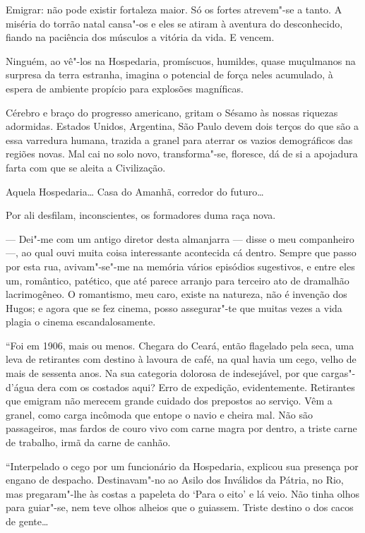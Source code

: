 Emigrar: não pode existir fortaleza maior. Só os fortes atrevem"-se a
tanto. A miséria do torrão natal cansa"-os e eles se atiram à aventura do
desconhecido, fiando na paciência dos músculos a vitória da vida. E
vencem.

Ninguém, ao vê"-los na Hospedaria, promíscuos, humildes, quase muçulmanos
na surpresa da terra estranha, imagina o potencial de força neles
acumulado, à espera de ambiente propício para explosões magníficas.

Cérebro e braço do progresso americano, gritam o Sésamo às nossas
riquezas adormidas. Estados Unidos, Argentina, São Paulo devem dois
terços do que são a essa varredura humana, trazida a granel para aterrar
os vazios demográficos das regiões novas. Mal cai no solo novo,
transforma"-se, floresce, dá de si a apojadura farta com que se aleita a
Civilização.

Aquela Hospedaria\ldots{} Casa do Amanhã, corredor do futuro\ldots{}

Por ali desfilam, inconscientes, os formadores duma raça nova.

--- Dei"-me com um antigo diretor desta almanjarra --- disse o meu
companheiro ---, ao qual ouvi muita coisa interessante acontecida cá
dentro. Sempre que passo por esta rua, avivam"-se"-me na memória vários
episódios sugestivos, e entre eles um, romântico, patético, que até
parece arranjo para terceiro ato de dramalhão lacrimogêneo. O
romantismo, meu caro, existe na natureza, não é invenção dos Hugos; e
agora que se fez cinema, posso assegurar"-te que muitas vezes a vida
plagia o cinema escandalosamente.

``Foi em 1906, mais ou menos. Chegara do Ceará, então flagelado pela
seca, uma leva de retirantes com destino à lavoura de café, na qual
havia um cego, velho de mais de sessenta anos. Na sua categoria dolorosa
de indesejável, por que cargas"-d'água dera com os costados aqui? Erro de
expedição, evidentemente. Retirantes que emigram não merecem grande
cuidado dos prepostos ao serviço. Vêm a granel, como carga incômoda que
entope o navio e cheira mal. Não são passageiros, mas fardos de couro
vivo com carne magra por dentro, a triste carne de trabalho, irmã da
carne de canhão.

``Interpelado o cego por um funcionário da Hospedaria, explicou sua
presença por engano de despacho. Destinavam"-no ao Asilo dos Inválidos da
Pátria, no Rio, mas pregaram"-lhe às costas a papeleta do `Para o eito' e
lá veio. Não tinha olhos para guiar"-se, nem teve olhos alheios que o
guiassem. Triste destino o dos cacos de gente\ldots{}

